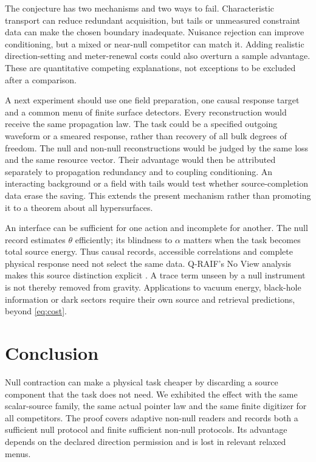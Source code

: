 \documentclass[12pt,a4paper]{article}
\theoremstyle{definition}
\begin{document}
The conjecture has two mechanisms and two ways to fail. Characteristic
transport can reduce redundant acquisition, but tails or unmeasured
constraint data can make the chosen boundary inadequate. Nuisance
rejection can improve conditioning, but a mixed or near-null competitor
can match it. Adding realistic direction-setting and meter-renewal costs
could also overturn a sample advantage. These are quantitative competing
explanations, not exceptions to be excluded after a comparison.

A next experiment should use one field preparation, one causal response
target and a common menu of finite surface detectors. Every reconstruction
would receive the same propagation law. The task could be a specified
outgoing waveform or a smeared response, rather than recovery of all bulk
degrees of freedom. The null and non-null reconstructions would be judged
by the same loss and the same resource vector. Their advantage would then
be attributed separately to propagation redundancy and to coupling
conditioning. An interacting background or a field with tails would test
whether source-completion data erase the saving. This extends the present
mechanism rather than promoting it to a theorem about all hypersurfaces.

An interface can be sufficient for one action and incomplete for another.
The null record estimates $\theta$ efficiently; its blindness to $\alpha$
matters when the task becomes total source energy. Thus causal records,
accessible correlations and complete physical response need not select
the same data. Q-RAIF's No View analysis makes this source distinction
explicit \cite{Liu2026NoView}. A trace term unseen by a null instrument
is not thereby removed from gravity. Applications to vacuum energy,
black-hole information or dark sectors require their own source and
retrieval predictions, beyond \eqref{eq:cost}.

\section{Conclusion}

Null contraction can make a physical task cheaper by discarding a source
component that the task does not need. We exhibited the effect with the
same scalar-source family, the same actual pointer law and the same
finite digitizer for all competitors. The proof covers adaptive non-null
readers and records both a sufficient null protocol and finite sufficient
non-null protocols. Its advantage depends on the declared direction
permission and is lost in relevant relaxed menus.
\end{document}
